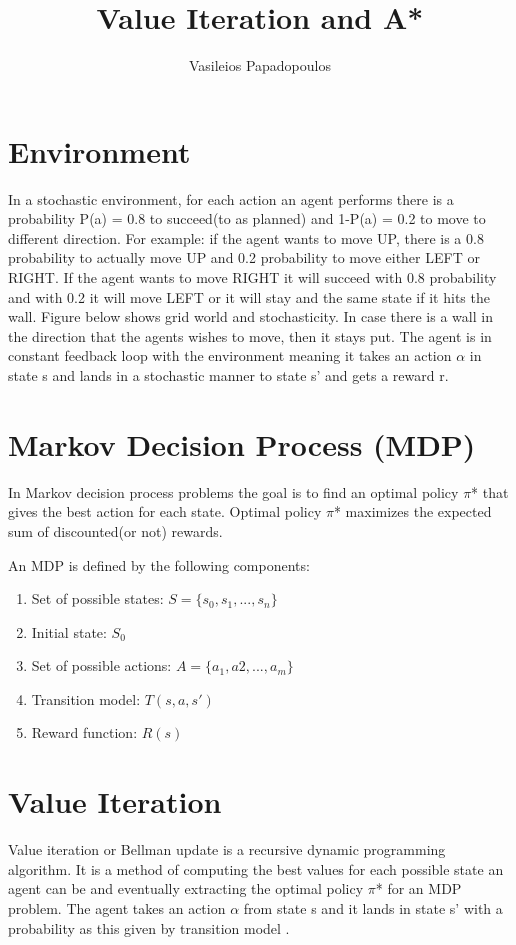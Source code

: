 \documentclass[10pt,a4paper,twocolumn]{article}
\title{Value Iteration and A*}
\author{Vasileios Papadopoulos}
\begin{document}
	\maketitle
	\section{Environment}
	
	In a stochastic environment, for each action an agent performs there is a probability P(a) = 0.8 to succeed(to as planned) and 1-P(a) = 0.2 to move to different direction. For example: if the agent wants to move UP, there is a 0.8 probability to actually move UP and 0.2 probability to move either LEFT or RIGHT. If the agent wants to move RIGHT it will succeed with 0.8 probability and with 0.2 it will move LEFT or it will stay and the same state if it hits the wall. Figure below shows grid world and stochasticity.
	In case there is a wall in the direction that the agents wishes to move, then it stays put.
	The agent is in constant feedback loop with the environment meaning it takes an action $\alpha$ in state s and lands in a stochastic manner to state s’ and gets a reward r.
	
	\section{Markov Decision Process (MDP)}
	
	In Markov decision process problems the goal is to find an optimal policy $\pi$* that gives  the best action for each state. Optimal policy $\pi$* maximizes the expected sum of discounted(or not) rewards.
	
	An MDP is defined by the following components:
	\begin{enumerate}
		\item Set of possible states: $S = \{ s_{0}, s_{1}, ..., s_{n} \}$
		\item Initial state: $S_{0}$
		\item Set of possible actions: $A = \{ a_{1}, a{2}, ..., a_{m} \}$
		\item Transition model: $T(s, a, s')$
		\item Reward function: $R(s)$
	\end{enumerate}
	 
	
	\section{Value Iteration}
	Value iteration or Bellman update is a recursive dynamic programming algorithm. It is a method of computing the best values for each possible state an agent can be and eventually extracting the optimal policy $\pi$* for an MDP problem. The agent takes an action $\alpha$ from state s and it lands in state s’ with a probability as this given by transition model . 
	
\end{document}
